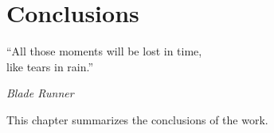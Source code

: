 \chapter{Conclusions}
\label{ch:conc}
\epigraph{\enquote{All those moments will be lost in time, \\
like tears in rain.}}{\emph{Blade Runner}}

This chapter summarizes the conclusions of the work.
